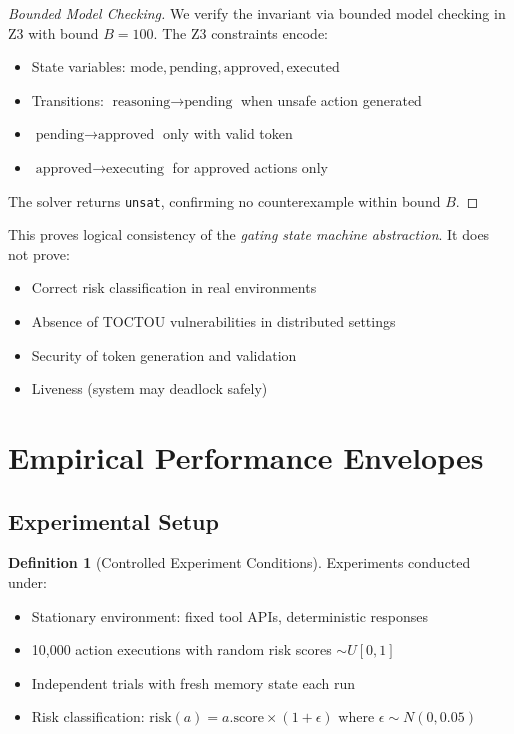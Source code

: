 \documentclass[12pt]{article}
\theoremstyle{definition}
\newtheorem{definition}{Definition}[section]
\begin{document}
\begin{proof}[Bounded Model Checking]
We verify the invariant via bounded model checking in Z3 with bound $B=100$. The Z3 constraints encode:
\begin{itemize}
    \item State variables: $\text{mode}, \text{pending}, \text{approved}, \text{executed}$
    \item Transitions: $\text{reasoning} \to \text{pending}$ when unsafe action generated
    \item $\text{pending} \to \text{approved}$ only with valid token
    \item $\text{approved} \to \text{executing}$ for approved actions only
\end{itemize}
The solver returns \texttt{unsat}, confirming no counterexample within bound $B$.
\end{proof}

\begin{remark}
This proves logical consistency of the \emph{gating state machine abstraction}. It does not prove:
\begin{itemize}
    \item Correct risk classification in real environments
    \item Absence of TOCTOU vulnerabilities in distributed settings
    \item Security of token generation and validation
    \item Liveness (system may deadlock safely)
\end{itemize}
\end{remark}

\section{Empirical Performance Envelopes}

\subsection{Experimental Setup}

\begin{definition}[Controlled Experiment Conditions]
Experiments conducted under:
\begin{itemize}
    \item Stationary environment: fixed tool APIs, deterministic responses
    \item 10,000 action executions with random risk scores $\sim U[0,1]$
    \item Independent trials with fresh memory state each run
    \item Risk classification: $\text{risk}(a) = a.\text{score} \times (1 + \epsilon)$ where $\epsilon \sim N(0, 0.05)$
\end{itemize}
\end{definition}
\end{document}
